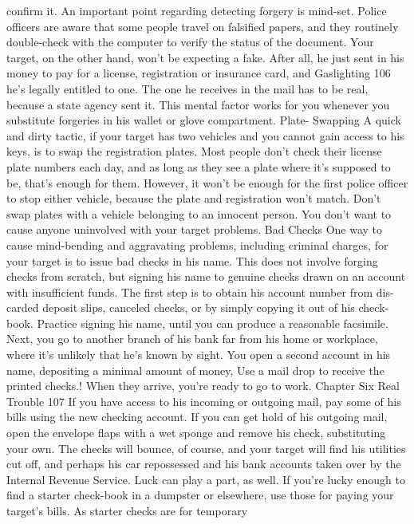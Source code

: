 \documentclass{book}
\begin{document}
confirm it. 
An important point regarding detecting forgery is mind-set. 
Police officers are aware that some people travel on falsified 
papers, and they routinely double-check with the computer to 
verify the status of the document. Your target, on the other 
hand, won't be expecting a fake. After all, he just sent in his 
money to pay for a license, registration or insurance card, and  Gaslighting 
106 
he's legally entitled to one. The one he receives in the mail has 
to be real, because a state agency sent it. This mental factor 
works for you whenever you substitute forgeries in his wallet or 
glove compartment. 
Plate- Swapping 
A quick and dirty tactic, if your target has two vehicles and 
you cannot gain access to his keys, is to swap the registration 
plates. Most people don't check their license plate numbers 
each day, and as long as they see a plate where it's supposed to 
be, that's enough for them. However, it won't be enough for the 
first police officer to stop either vehicle, because the plate and 
registration won't match. 
Don't swap plates with a vehicle belonging to an innocent 
person. You don't want to cause anyone uninvolved with your 
target problems. 
Bad Checks 
One way to cause mind-bending and aggravating problems, 
including criminal charges, for your target is to issue bad 
checks in his name. This does not involve forging checks from 
scratch, but signing his name to genuine checks drawn on an 
account with insufficient funds. 
The first step is to obtain his account number from dis- 
carded deposit slips, canceled checks, or by simply copying it 
out of his check-book. Practice signing his name, until you can 
produce a reasonable facsimile. Next, you go to another branch 
of his bank far from his home or workplace, where it's unlikely 
that he’s known by sight. You open a second account in his 
name, depositing a minimal amount of money, Use a mail drop 
to receive the printed checks.! When they arrive, you're ready to 
go to work. 
Chapter Six 
Real Trouble 
107 
If you have access to his incoming or outgoing mail, pay 
some of his bills using the new checking account. If you can get 
hold of his outgoing mail, open the envelope flaps with a wet 
sponge and remove his check, substituting your own. The 
checks will bounce, of course, and your target will find his 
utilities cut off, and perhaps his car repossessed and his bank 
accounts taken over by the Internal Revenue Service. 
Luck can play a part, as well. If you're lucky enough to find 
a starter check-book in a dumpster or elsewhere, use those for 
paying your target's bills. As starter checks are for temporary 
\end{document}
